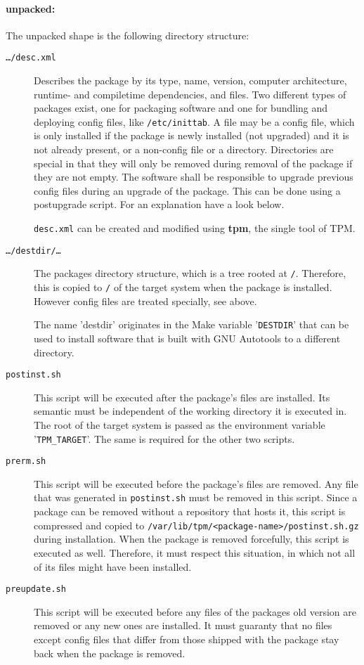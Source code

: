 \documentclass[a4paper]{article}
\newcommand{\file}[1]{\texttt{#1}}
\newcommand{\program}[1]{\textbf{#1}}
\newcommand{\variable}[1]{'\texttt{#1}'}
\begin{document}
	\paragraph{unpacked:}
	The unpacked shape is the following directory structure:
	\begin{description}
		\item[\file{\dots/desc.xml}] Describes the package by its type, name, version, computer architecture, runtime- and compiletime dependencies, and files. Two different types of packages exist, one for packaging software and one for bundling and deploying config files, like \file{/etc/inittab}. A file may be a config file, which is only installed if the package is newly installed (not upgraded) and it is not already present, or a non-config file or a directory. Directories are special in that they will only be removed during removal of the package if they are not empty. The software shall be responsible to upgrade previous config files during an upgrade of the package. This can be done using a postupgrade script. For an explanation have a look below.
		
		\file{desc.xml} can be created and modified using \program{tpm}, the single tool of TPM.
		
		\item[\file{\dots/destdir/\dots}] The packages directory structure, which is a tree rooted at \file{/}. Therefore, this is copied to \file{/} of the target system when the package is installed. However config files are treated specially, see above.
		
		The name 'destdir' originates in the Make variable \variable{DESTDIR} that can be used to install software that is built with GNU Autotools to a different directory.
		
		\item[\file{postinst.sh}] This script will be executed after the package's files are installed. Its semantic must be independent of the working directory it is executed in. The root of the target system is passed as the environment variable \variable{TPM\_TARGET}. The same is required for the other two scripts.
		
		\item[\file{prerm.sh}] This script will be executed before the package's files are removed. Any file that was generated in \file{postinst.sh} must be removed in this script. Since a package can be removed without a repository that hosts it, this script is compressed and copied to \file{/var/lib/tpm/<package-name>/postinst.sh.gz} during installation. When the package is removed forcefully, this script is executed as well. Therefore, it must respect this situation, in which not all of its files might have been installed.
		
		\item[\file{preupdate.sh}] This script will be executed before any files of the packages old version are removed or any new ones are installed. It must guaranty that no files except config files that differ from those shipped with the package stay back when the package is removed.
	\end{description}
\end{document}
